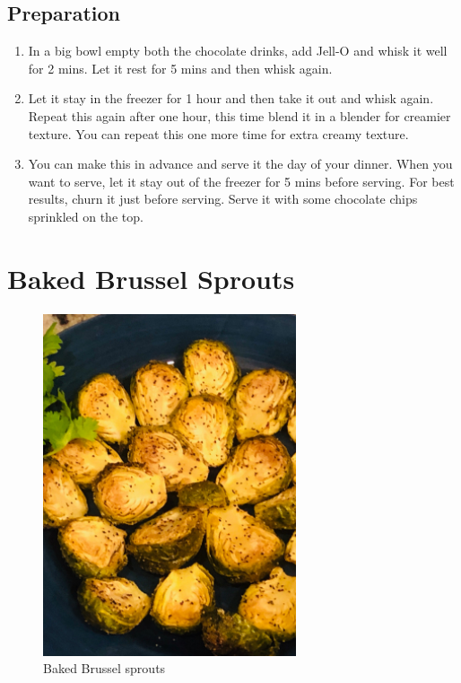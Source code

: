 \documentclass[
  oneside]{book}
\begin{document}
\hypertarget{preparation-5}{%
\subsection{Preparation}\label{preparation-5}}

\begin{enumerate}
\def\labelenumi{\arabic{enumi}.}
\item
  In a big bowl empty both the chocolate drinks, add Jell-O and whisk it well for 2 mins. Let it rest for 5 mins and then whisk again.
\item
  Let it stay in the freezer for 1 hour and then take it out and whisk again. Repeat this again after one hour, this time blend it in a blender for creamier texture. You can repeat this one more time for extra creamy texture.
\item
  You can make this in advance and serve it the day of your dinner. When you want to serve, let it stay out of the freezer for 5 mins before serving. For best results, churn it just before serving. Serve it with some chocolate chips sprinkled on the top.
\end{enumerate}

\hypertarget{baked-brussel-sprouts}{%
\section{Baked Brussel Sprouts}\label{baked-brussel-sprouts}}

\begin{figure}
\centering
\includegraphics{pictures/baked-brussel-sprouts.png}
\caption{Baked Brussel sprouts}
\end{figure}
\end{document}
